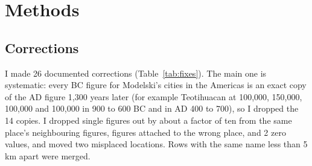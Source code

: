 \documentclass[11pt,a4paper]{article}
\begin{document}
\section{Methods}
\subsection{Corrections}
I made 26 documented corrections (Table~\ref{tab:fixes}). The main one is systematic: every BC figure for Modelski's cities in the Americas is an exact copy of the AD figure 1,300 years later (for example Teotihuacan at 100,000, 150,000, 100,000 and 100,000 in 900 to 600 BC and in AD 400 to 700), so I dropped the 14 copies. I dropped single figures out by about a factor of ten from the same place's neighbouring figures, figures attached to the wrong place, and 2 zero values, and moved two misplaced locations. Rows with the same name less than 5 km apart were merged.
\end{document}
